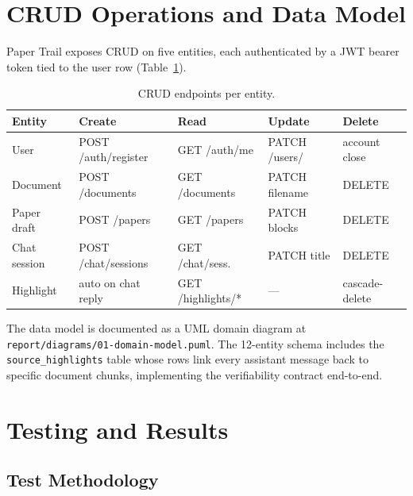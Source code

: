 \documentclass[conference]{IEEEtran}
\begin{document}
\section{CRUD Operations and Data Model}
\label{sec:crud}

Paper Trail exposes CRUD on five entities, each authenticated by a JWT bearer
token tied to the user row (Table~\ref{tab:crud}).

\begin{table}[t]
  \caption{CRUD endpoints per entity.}
  \label{tab:crud}
  \centering
  \renewcommand{\arraystretch}{1.2}
  \begin{tabular}{lllll}
    \toprule
    \textbf{Entity} & \textbf{Create} & \textbf{Read} & \textbf{Update} & \textbf{Delete}\\
    \midrule
    User        & POST /auth/register  & GET /auth/me       & PATCH /users/   & account close\\
    Document    & POST /documents      & GET /documents     & PATCH filename  & DELETE\\
    Paper draft & POST /papers         & GET /papers        & PATCH blocks    & DELETE\\
    Chat session& POST /chat/sessions  & GET /chat/sess.    & PATCH title     & DELETE\\
    Highlight   & auto on chat reply   & GET /highlights/*  & ---             & cascade-delete\\
    \bottomrule
  \end{tabular}
\end{table}

The data model is documented as a UML domain diagram at
\texttt{report/diagrams/01-domain-model.puml}. The 12-entity schema includes
the \texttt{source\_highlights} table whose rows link every assistant message
back to specific document chunks, implementing the verifiability contract
end-to-end.

\section{Testing and Results}
\label{sec:evaluation}

\subsection{Test Methodology}
\end{document}
